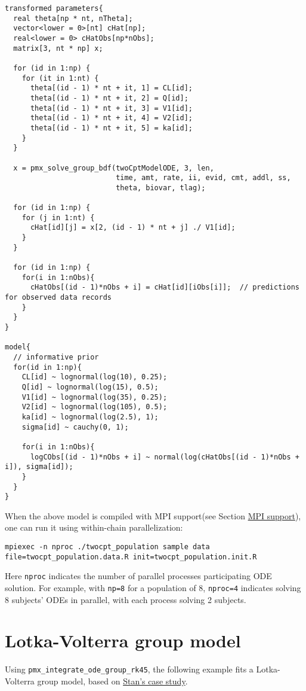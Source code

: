 \documentclass[12pt, reqno, oneside]{amsbook}
\numberwithin{equation}{chapter}
\numberwithin{figure}{chapter}
\numberwithin{table}{chapter}
\theoremstyle{remark}
\begin{document}
\begin{verbatim}
transformed parameters{
  real theta[np * nt, nTheta];
  vector<lower = 0>[nt] cHat[np];
  real<lower = 0> cHatObs[np*nObs];
  matrix[3, nt * np] x;

  for (id in 1:np) {
    for (it in 1:nt) {
      theta[(id - 1) * nt + it, 1] = CL[id];
      theta[(id - 1) * nt + it, 2] = Q[id];
      theta[(id - 1) * nt + it, 3] = V1[id];
      theta[(id - 1) * nt + it, 4] = V2[id];
      theta[(id - 1) * nt + it, 5] = ka[id];
    }
  }

  x = pmx_solve_group_bdf(twoCptModelODE, 3, len,
                          time, amt, rate, ii, evid, cmt, addl, ss,
                          theta, biovar, tlag);

  for (id in 1:np) {
    for (j in 1:nt) {
      cHat[id][j] = x[2, (id - 1) * nt + j] ./ V1[id];
    }
  }

  for (id in 1:np) {
    for(i in 1:nObs){
      cHatObs[(id - 1)*nObs + i] = cHat[id][iObs[i]];  // predictions for observed data records
    }
  }
}

model{
  // informative prior
  for(id in 1:np){
    CL[id] ~ lognormal(log(10), 0.25);
    Q[id] ~ lognormal(log(15), 0.5);
    V1[id] ~ lognormal(log(35), 0.25);
    V2[id] ~ lognormal(log(105), 0.5);
    ka[id] ~ lognormal(log(2.5), 1);
    sigma[id] ~ cauchy(0, 1);

    for(i in 1:nObs){
      logCObs[(id - 1)*nObs + i] ~ normal(log(cHatObs[(id - 1)*nObs + i]), sigma[id]);
    }
  }
}
\end{verbatim}

When the above model is compiled with MPI support(see Section
\hyperref[mpi-support]{MPI support}), one can run it using within-chain parallelization:
\begin{verbatim}
mpiexec -n nproc ./twocpt_population sample data file=twocpt_population.data.R init=twocpt_population.init.R
\end{verbatim}
Here \texttt{nproc} indicates the number of parallel
processes participating ODE solution. For example, with
\texttt{np=8} for a population of 8,
\texttt{nproc=4} indicates solving 8 subjects' ODEs in
parallel, with each process solving 2 subjects.

\section{Lotka-Volterra group model}
\label{sec:org1326763}
Using \texttt{pmx\_integrate\_ode\_group\_rk45}, the following example fits
a Lotka-Volterra group model, based on \href{https://mc-stan.org/users/documentation/case-studies/lotka-volterra-predator-prey.html}{Stan's case study}.
\end{document}
